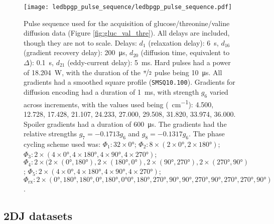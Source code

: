 \begin{figure}[H]
    \centering
    \texttt{[image: ledbpgp\_pulse\_sequence/ledbpgp\_pulse\_sequence.pdf]}
    \caption[
        Pulse sequence used for the acquisition of glucose/threonine/valine
        diffusion data.
    ]{
        Pulse sequence used for the acquisition of glucose/threonine/valine
        diffusion data (Figure \ref{fig:gluc_val_thre}). All
        delays are included, though they are not to scale.
        Delays:
        $d_1$ (relaxation delay): \qty{6}{\second},
        $d_{16}$ (gradient recovery delay): \qty{200}{\micro\second},
        $d_{20}$ (diffusion time, equivalent to $\Delta$): \qty{0.1}{\second},
        $d_{21}$ (eddy-current delay): \qty{5}{\milli\second}.
        Hard pulses had a power of \qty{18.204}{\watt},
        with the duration of the $\nicefrac{\pi}{2}$ pulse being
        \qty{10}{\micro\second}.
        All gradients had a smoothed square profile
        (\texttt{SMSQ10.100}).
        Gradients for diffusion encoding had a duration of
        \qty{1}{\milli\second}, with strength $g_6$ varied across increments,
        with the values used being (\unit{\gauss \per \centi \meter}):
        4.500,
        12.728,
        17.428,
        21.107,
        24.233,
        27.000,
        29.508,
        31.820,
        33.974,
        36.000.
        Spoiler gradients had a duration of \qty{600}{\micro\second}. The
        gradients had the relative strengths $g_7=-0.1713g_6$ and
        $g_8=-0.1317g_6$.
        The phase cycling scheme used was:
        $\Phi_1: 32 \times \ang{0}$;
        $\Phi_2: 8 \times (2 \times \ang{0}, 2 \times \ang{180})$;
        $\Phi_3: 2 \times (4 \times \ang{0}, 4 \times \ang{180}, 4 \times \ang{90}, 4 \times \ang{270})$;
        $\Phi_4: 2 \times (2 \times (\ang{0}, \ang{180}), 2 \times (\ang{180}, \ang{0}), 2 \times (\ang{90}, \ang{270}), 2 \times (\ang{270}, \ang{90})$;
        $\Phi_5: 2 \times (4 \times \ang{0}, 4 \times \ang{180}, 4 \times \ang{90}, 4 \times \ang{270})$;
        $\Phi_{\text{rx}}: 2 \times (\ang{0}, \ang{180}, \ang{180}, \ang{0}, \ang{180}, \ang{0} \ang{0}, \ang{180},
        \ang{270}, \ang{90}, \ang{90}, \ang{270}, \ang{90}, \ang{270}, \ang{270}, \ang{90})$.
    }
    \label{fig:ledbpgp2s}
\end{figure}

\subsection{\acs{2DJ} datasets}
\label{subsec:cupid-experimental}

